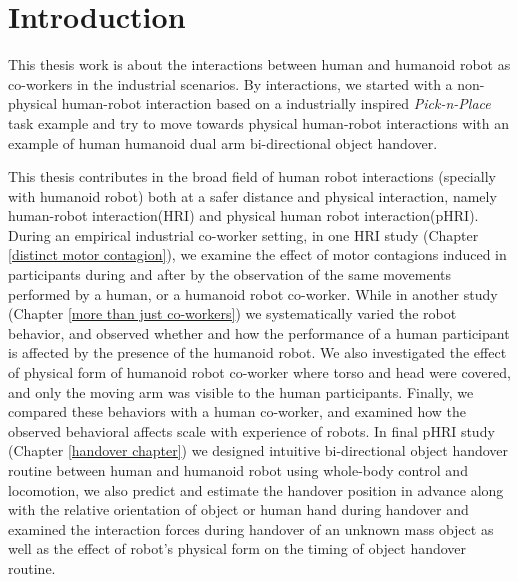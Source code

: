 {\color{blue}\chapter*{Introduction}}

This thesis work is about the interactions between human and humanoid robot as co-workers in the industrial scenarios. By interactions, we started with a non-physical human-robot interaction based on a industrially inspired \textit{Pick-n-Place} task example and try to move towards physical human-robot interactions with an example of human humanoid dual arm bi-directional object handover.

This thesis contributes in the broad field of human robot interactions (specially with humanoid robot) both at a safer distance and physical interaction, namely human-robot interaction(HRI) and physical human robot interaction(pHRI). During an empirical industrial co-worker setting, in one HRI study (Chapter \ref{distinct motor contagion}), we examine the effect of motor contagions induced in participants during and after by the observation of the same movements performed by a human, or a humanoid robot co-worker. While in  another study (Chapter \ref{more than just co-workers}) we systematically varied the robot behavior, and observed whether and how the performance of a human participant is affected by the presence of the humanoid robot. We also investigated the effect of physical form of humanoid robot co-worker where torso and head were covered, and only the moving arm was visible to the human participants. Finally, we compared these behaviors with a human co-worker, and examined how the observed behavioral affects scale with experience of robots. In final pHRI study (Chapter \ref{handover chapter}) we designed intuitive bi-directional object handover routine between human and humanoid robot using whole-body control and locomotion, we also predict and estimate the handover position in advance along with the relative orientation of object or human hand during handover and examined the interaction forces during handover of an unknown mass object as well as the effect of robot's physical form on the timing of object handover routine.


%
%
%


\clearpage
